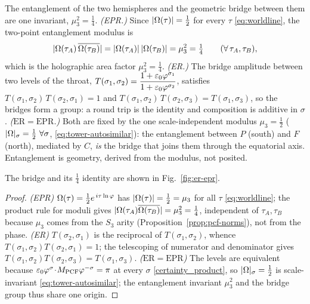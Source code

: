 \begin{proposition}[$\mathrm{ER}=\mathrm{EPR}$ from the modulus]\label{prop:er-epr}
The entanglement of the two hemispheres and the geometric bridge between them are one
invariant, $\mu_3^{2}=\tfrac14$.
\emph{(EPR.)} Since $|\Omega(\tau)|=\tfrac12$ for every $\tau$ \eqref{eq:worldline}, the two-point
entanglement modulus is
\[
  |\Omega(\tau_A)\,\overline{\Omega(\tau_B)}|=|\Omega(\tau_A)|\,|\Omega(\tau_B)|=\mu_3^{2}=\tfrac14
  \qquad(\forall\,\tau_A,\tau_B),
\]
which is the holographic area factor $\mu_3^{2}=\tfrac14$. %
\emph{(ER.)} The bridge amplitude between two levels of the throat,
$T(\sigma_1,\sigma_2)=\dfrac{1+\varepsilon_{0}\varphi^{\sigma_1}}{1+\varepsilon_{0}\varphi^{\sigma_2}}$,
satisfies $T(\sigma_1,\sigma_2)\,T(\sigma_2,\sigma_1)=1$ and
$T(\sigma_1,\sigma_2)\,T(\sigma_2,\sigma_3)=T(\sigma_1,\sigma_3)$, so the bridges form a group:
a round trip is the identity and composition is additive in $\sigma$.
\emph{($\mathrm{ER}=\mathrm{EPR}$.)} Both are fixed by the one scale-independent modulus
$\mu_3=\tfrac12$ ($|\Om|_\sigma=\tfrac12\ \forall\sigma$, \eqref{eq:tower-autosimilar}): the
entanglement between $P$ (south) and $F$ (north), mediated by $C$, \emph{is} the bridge that joins
them through the equatorial axis. Entanglement is geometry, derived from the modulus, not posited.

\end{proposition} The bridge and its $\tfrac14$ identity are shown in Fig.~\ref{fig:er-epr}.

\begin{proof}
\emph{(EPR)} $\Omega(\tau)=\tfrac12 e^{\,i\tau\ln\varphi}$ has $|\Omega(\tau)|=\tfrac12=\mu_3$ for all
$\tau$ \eqref{eq:worldline}; the product rule for moduli gives
$|\Omega(\tau_A)\overline{\Omega(\tau_B)}|=\mu_3^{2}=\tfrac14$, independent of $\tau_A,\tau_B$ because
$\mu_3$ comes from the $S_3$ arity (Proposition~\ref{prop:pcf-norms}), not from the phase.
\emph{(ER)} $T(\sigma_2,\sigma_1)$ is the reciprocal of $T(\sigma_1,\sigma_2)$, whence
$T(\sigma_1,\sigma_2)T(\sigma_2,\sigma_1)=1$; the telescoping of numerator and denominator gives
$T(\sigma_1,\sigma_2)T(\sigma_2,\sigma_3)=T(\sigma_1,\sigma_3)$.
\emph{($\mathrm{ER}=\mathrm{EPR}$)} The levels are equivalent because
$\varepsilon_{0}\varphi^{\sigma}\!\cdot\!M_{\mathrm{PCF}}\varphi^{-\sigma}=\pi$ at every $\sigma$ \eqref{certainty_product}, so
$|\Omega|_\sigma=\tfrac12$ is scale-invariant \eqref{eq:tower-autosimilar}; the entanglement invariant
$\mu_3^{2}$ and the bridge group thus share one origin.
\end{proof}

